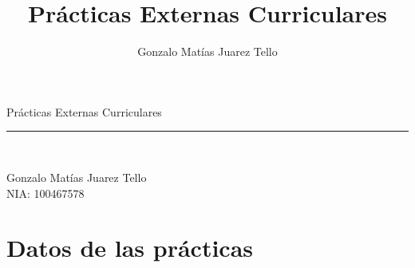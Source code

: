 \documentclass[12pt]{extreport} %
\title{Prácticas Externas Curriculares}
\author{Gonzalo Matías Juarez Tello}
\date{}
\begin{document}
\begin{titlepage}
	\begin{sffamily}
	\color{azulUC3M}
	\begin{center}
		\begin{figure}[H] %
		\end{figure}
		\vspace{2.5cm}
		{\Huge Prácticas Externas Curriculares}\\
		\vspace*{0.5cm}
	 	\rule{10.5cm}{0.1mm}\\
		\vspace*{1cm}
		\begin{Large}
		  Gonzalo Matías Juarez Tello\\
                  NIA: 100467578\\
		\end{Large}
	\end{center}
	\vfill
	\color{black}
	\end{sffamily}
\end{titlepage}

\setcounter{page}{2}
\tableofcontents
\thispagestyle{fancy}
\thispagestyle{empty}
\mbox{}

\section*{Datos de las prácticas}
\end{document}
